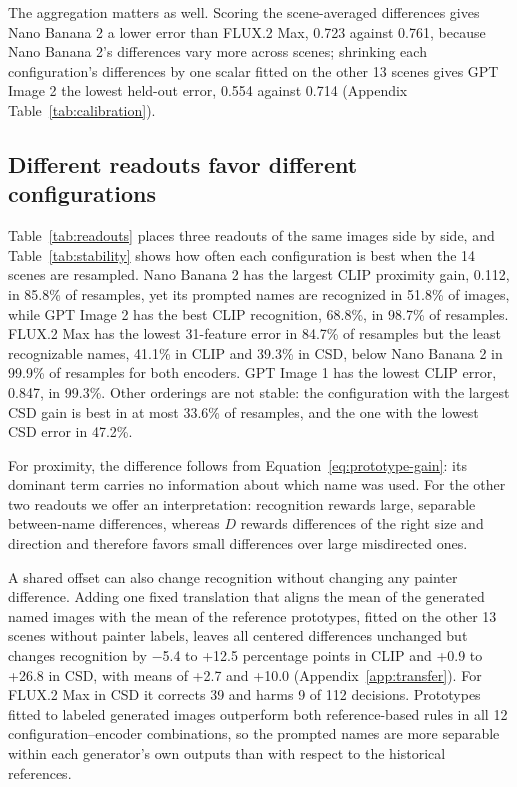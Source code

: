 \documentclass[10pt]{article}
\begin{document}
The aggregation matters as well. Scoring the scene-averaged differences gives Nano Banana 2 a lower
error than FLUX.2 Max, 0.723 against 0.761, because Nano Banana 2's differences vary more across
scenes; shrinking each configuration's differences by one scalar fitted on the other 13 scenes gives
GPT Image 2 the lowest held-out error, 0.554 against 0.714 (Appendix Table~\ref{tab:calibration}).

\subsection{Different readouts favor different configurations}\label{sec:readouts}




Table~\ref{tab:readouts} places three readouts of the same images side by side, and
Table~\ref{tab:stability} shows how often each configuration is best when the 14 scenes are
resampled. Nano Banana 2 has the largest CLIP proximity gain, 0.112, in 85.8\% of resamples, yet its
prompted names are recognized in 51.8\% of images, while GPT Image 2 has the best CLIP recognition,
68.8\%, in 98.7\% of resamples. FLUX.2 Max has the lowest 31-feature error in 84.7\% of resamples
but the least recognizable names, 41.1\% in CLIP and 39.3\% in CSD, below Nano Banana 2 in 99.9\%
of resamples for both encoders. GPT Image 1 has the lowest CLIP error, 0.847, in 99.3\%. Other
orderings are not stable: the configuration with the largest CSD gain is best in at most 33.6\% of
resamples, and the one with the lowest CSD error in 47.2\%.

For proximity, the difference follows from Equation~\ref{eq:prototype-gain}: its dominant term
carries no information about which name was used. For the other two readouts we offer an
interpretation: recognition rewards large, separable between-name differences, whereas $D$ rewards
differences of the right size and direction and therefore favors small differences over large
misdirected ones.

A shared offset can also change recognition without changing any painter difference. Adding one
fixed translation that aligns the mean of the generated named images with the mean of the
reference prototypes, fitted on the other 13 scenes without painter labels, leaves all centered
differences unchanged but changes recognition by $-$5.4 to +12.5 percentage points in CLIP and
+0.9 to +26.8 in CSD, with means of +2.7 and +10.0 (Appendix~\ref{app:transfer}). For FLUX.2 Max
in CSD it corrects 39 and harms 9 of 112 decisions. Prototypes fitted to labeled generated images
outperform both reference-based rules in all 12 configuration--encoder combinations, so the
prompted names are more separable within each generator's own outputs than with respect to the
historical references.
\end{document}
